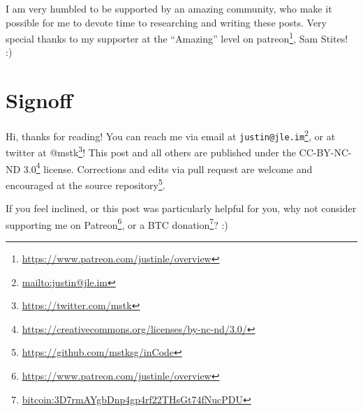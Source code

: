 \documentclass[]{article}
\renewcommand{\href}[2]{#2\footnote{\url{#1}}}
\begin{document}
I am very humbled to be supported by an amazing community, who make it possible
for me to devote time to researching and writing these posts. Very special
thanks to my supporter at the ``Amazing'' level on
\href{https://www.patreon.com/justinle/overview}{patreon}, Sam Stites! :)

\hypertarget{signoff}{%
\section{Signoff}\label{signoff}}

Hi, thanks for reading! You can reach me via email at
\href{mailto:justin@jle.im}{\nolinkurl{justin@jle.im}}, or at twitter at
\href{https://twitter.com/mstk}{@mstk}! This post and all others are published
under the \href{https://creativecommons.org/licenses/by-nc-nd/3.0/}{CC-BY-NC-ND
3.0} license. Corrections and edits via pull request are welcome and encouraged
at \href{https://github.com/mstksg/inCode}{the source repository}.

If you feel inclined, or this post was particularly helpful for you, why not
consider \href{https://www.patreon.com/justinle/overview}{supporting me on
Patreon}, or a \href{bitcoin:3D7rmAYgbDnp4gp4rf22THsGt74fNucPDU}{BTC donation}?
:)
\end{document}
